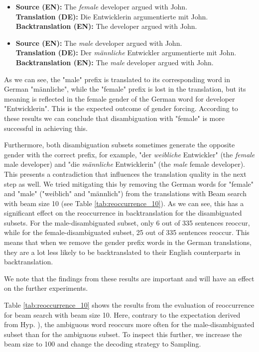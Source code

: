 \begin{itemize}
    \item \textbf{Source (EN):} The \textit{female} developer argued with John. \\
    \textbf{Translation (DE):} Die Entwicklerin argumentierte mit John. \\
    \textbf{Backtranslation (EN):} The developer argued with John.
    
    \item \textbf{Source (EN):} The \textit{male} developer argued with John. \\
    \textbf{Translation (DE):} Der \textit{männliche} Entwickler argumentierte mit John. \\
    \textbf{Backtranslation (EN):} The \textit{male} developer argued with John.
\end{itemize}

As we can see, the "male" prefix is translated to its corresponding word in German "männliche", while the "female" prefix is lost in the translation, but its meaning is reflected in the female gender of the German word for developer "Entwicklerin". This is the expected outcome of gender forcing. According to these results we can conclude that disambiguation with "female" is more successful in achieving this.

Furthermore, both disambiguation subsets sometimes generate the opposite gender with the correct prefix, for example, "der \textit{weibliche} Entwickler" (the \textit{female} male developer) and "die \textit{männliche} Entwicklerin" (the \textit{male} female developer). This presents a contradiction that influences the translation quality in the next step as well. We tried mitigating this by removing the German words for "female" and "male" ("weiblich" and "männlich") from the translations with Beam search with beam size 10 (see Table \ref{tab:reoccurrence_10}). As we can see, this has a significant effect on the reoccurrence in backtranslation for the disambiguated subsets. For the male-disambiguated subset, only 6 out of 335 sentences reoccur, while for the female-disambiguated subset, 25 out of 335 sentences reoccur. This means that when we remove the gender prefix words in the German translations, they are a lot less likely to be backtranslated to their English counterparts in backtranslation.  

We note that the findings from these results are important and will have an effect on the further experiments.

Table \ref{tab:reoccurrence_10} shows the results from the evaluation of reoccurrence for beam search with beam size 10. Here, contrary to the expectation derived from Hyp. ), the ambiguous word reoccurs more often for the male-disambiguated subset than for the ambiguous subset. To inspect this further, we increase the beam size to 100 and change the decoding strategy to Sampling.

